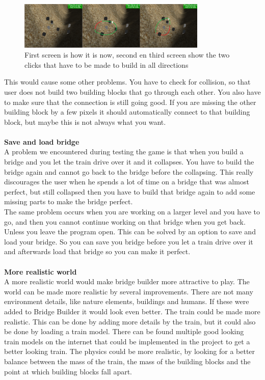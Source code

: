 \begin{figure}[H]
    \centering
    \includegraphics[width=0.8\textwidth]{screenshots/TwoClick.png}
    \caption{First screen is how it is now, second en third screen show the two clicks that have to be made to build in all directions}
    \label{fig:twoclick}
\end{figure}
This would cause some other problems. You have to check for collision, so that user does not build two building blocks that go through each other. You also have to make sure that the connection is still going good. If you are missing the other building block by a few pixels it should automatically connect to that building block, but maybe this is not always what you want.  \\ \\
\textbf{Save and load bridge}\\
A problem we encountered during testing the game is that when you build a bridge and you let the train drive over it and it collapses. You have to build the bridge again and cannot go back to the bridge before the collapsing. This really discourages the user when he spends a lot of time on a bridge that was almost perfect, but still collapsed then you have to build that bridge again to add some missing parts to make the bridge perfect. \\
The same problem occurs when you are working on a larger level and you have to go, and then you cannot continue working on that bridge when you get back. Unless you leave the program open.  This can be solved by an option to save and load your bridge. So you can save you bridge before you let a train drive over it and afterwards load that bridge so you can make it perfect.\\ \\
\textbf{More realistic world}\\
A more realistic world would make bridge builder more attractive to play. The world can be made more realistic by several improvements. 
There are not many environment details, like nature elements, buildings and humans. If these were added to Bridge Builder it would look even better.
The train could be made more realistic. This can be done by adding more details by the train, but it could also be done by loading a train model. There can be found multiple good looking train models on the internet that could be implemented in the project to get a better looking train.
The physics could be more realistic, by looking for a better balance between the mass of the train, the mass of the building blocks and the point at which building blocks fall apart. 
